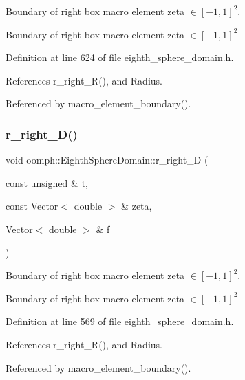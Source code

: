 Boundary of right box macro element zeta $ \in [-1,1]^2 $. 

Boundary of right box macro element zeta $ \in [-1,1]^2 $ 

Definition at line 624 of file eighth\+\_\+sphere\+\_\+domain.\+h.



References r\+\_\+right\+\_\+\+R(), and Radius.



Referenced by macro\+\_\+element\+\_\+boundary().

\mbox{\label{classoomph_1_1EighthSphereDomain_a7a4a1a98b542afd49a5ec8abfda287fc}} 
\subsubsection{\texorpdfstring{r\+\_\+right\+\_\+\+D()}{r\_right\_D()}}
{\footnotesize\ttfamily void oomph\+::\+Eighth\+Sphere\+Domain\+::r\+\_\+right\+\_\+D (\begin{DoxyParamCaption}\item[{const unsigned \&}]{t,  }\item[{const Vector$<$ double $>$ \&}]{zeta,  }\item[{Vector$<$ double $>$ \&}]{f }\end{DoxyParamCaption})\hspace{0.3cm}{\ttfamily [private]}}



Boundary of right box macro element zeta $ \in [-1,1]^2 $. 

Boundary of right box macro element zeta $ \in [-1,1]^2 $ 

Definition at line 569 of file eighth\+\_\+sphere\+\_\+domain.\+h.



References r\+\_\+right\+\_\+\+R(), and Radius.



Referenced by macro\+\_\+element\+\_\+boundary().

\mbox{\label{classoomph_1_1EighthSphereDomain_aa08635438bff5a3d377d45c8c9c2b377}} 
